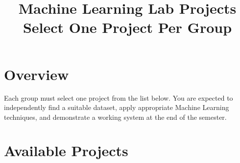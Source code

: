\documentclass[12pt, a4paper]{article}
\title{%
  {\Large\bfseries Machine Learning Lab Projects}\\[0.4em]
  {\normalsize Select One Project Per Group}
}
\author{}
\date{}
\begin{document}
\maketitle
\thispagestyle{empty}

\section{Overview}

Each group must select one project from the list below. You are expected to independently find a suitable
dataset, apply appropriate Machine Learning techniques, and demonstrate a working system at the end of
the semester.

\section{Available Projects}
\end{document}
